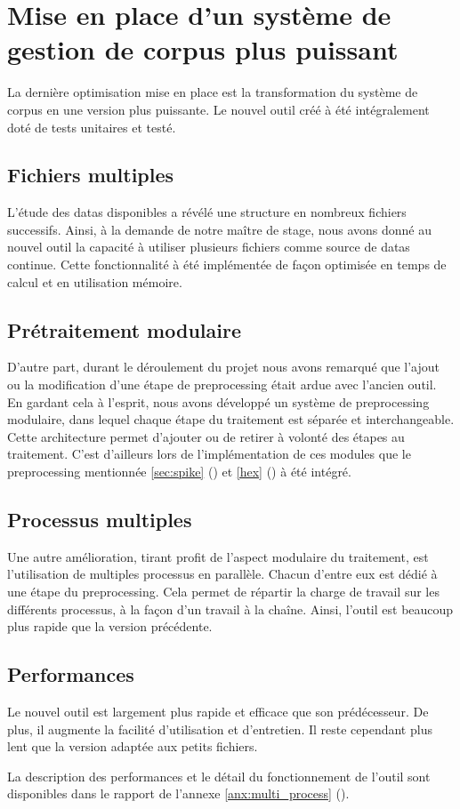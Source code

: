 \section{Mise en place d'un système de gestion de corpus plus puissant}\label{sec:papud_mulitiqueue}
La dernière optimisation mise en place est la transformation du système de corpus en une version plus puissante. Le nouvel outil créé à été intégralement doté de tests unitaires et testé.

\subsection{Fichiers multiples}
L'étude des \glspl{data} disponibles a révélé une structure en nombreux fichiers successifs.
Ainsi, à la demande de notre maître de stage, nous avons donné au nouvel outil la capacité à utiliser plusieurs fichiers comme source de \glspl{data} continue.
Cette fonctionnalité à été implémentée de façon optimisée en temps de calcul et en utilisation mémoire.

\subsection{Prétraitement modulaire}
D'autre part, durant le déroulement du projet nous avons remarqué que l'ajout ou la modification d'une étape de \gls{preprocessing} était ardue avec l'ancien outil.
En gardant cela à l'esprit, nous avons développé un système de \gls{preprocessing} modulaire, dans lequel chaque étape du traitement est séparée et interchangeable.
Cette architecture permet d'ajouter ou de retirer à volonté des étapes au traitement.
C'est d'ailleurs lors de l'implémentation de ces modules que le \gls{preprocessing} mentionnée \autoref{sec:spike} () et \autoref{hex} () à été intégré.

\subsection{Processus multiples}
Une autre amélioration, tirant profit de l'aspect modulaire du traitement, est l'utilisation de multiples processus en parallèle.
Chacun d'entre eux est dédié à une étape du \gls{preprocessing}.
Cela permet de répartir la charge de travail sur les différents processus, à la façon d'un travail à la chaîne.
Ainsi, l'outil est beaucoup plus rapide que la version précédente.

\subsection{Performances}
Le nouvel outil est largement plus rapide et efficace que son prédécesseur.
De plus, il augmente la facilité d'utilisation et d'entretien.
Il reste cependant plus lent que la version adaptée aux petits fichiers.

La description des performances et le détail du fonctionnement de l'outil sont disponibles dans le rapport de l'annexe \ref{anx:multi_process} ().
\pagebreak
